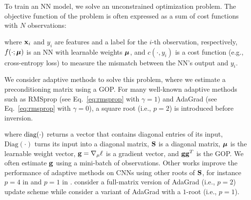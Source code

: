 \vspace{-0.15cm}
To train an NN model,
we solve an unconstrained optimization problem. The objective function of the problem is often expressed as a sum of cost functions with $N$ observations:

\vspace{-0.35cm}

where $\mbox{$\mbox{$\mathbf{x}$}$}_i$ and $y_i$ are features and a label for the $i$-th observation, respectively,
$f(\cdot;\mbox{$\mbox{$\boldsymbol{\mu}$}$})$ is an NN with learnable weights $\mbox{$\mbox{$\boldsymbol{\mu}$}$}$,  and $c(\cdot, y_i)$ is a cost function (e.g., cross-entropy loss) to measure the mismatch between the NN's output and $y_i$.


We consider adaptive methods to solve this problem, where we estimate a preconditioning matrix using a GOP. For many well-known adaptive methods such as RMSprop \citep{tieleman2012rmsprop} (see Eq.~\eqref{eq:rmsprop} with  $\gamma=1$) and AdaGrad \citep{duchi2011adaptive} (see  Eq.~\eqref{eq:rmsprop} with  $\gamma=0$), a square root (i.e., $p=2$) is introduced before inversion.
%

\vspace{-0.4cm}

\vspace{-0.05cm}
where 
$\mbox{$\mbox{diag}$}(\cdot)$ returns a vector that contains diagonal entries
of its input,  $\mathrm{Diag}(\cdot)$ turns its input into a diagonal matrix,
$\mbox{$\mbox{$\mathbf{S}$}$}$ is a diagonal matrix, $\mbox{$\mbox{$\boldsymbol{\mu}$}$}$ is the learnable weight vector,  $\mbox{$\mbox{$\mathbf{g}$}$}=\nabla_\mu \ell$ is a gradient vector, and $\mbox{$\mbox{$\mathbf{g}$}$}\mbox{$\mbox{$\mathbf{g}$}$}^T$ is the GOP. We often estimate $\mbox{$\mbox{$\mathbf{g}$}$}$ using a mini-batch of observations.
Other works improve the performance of adaptive methods on CNNs using other roots of $\mbox{$\mbox{$\mathbf{S}$}$}$, for instance $p=4$ in \citet{chen2021closing} and $p=1$ in \citet{lincan2024}.
\citet{duchi2011adaptive} consider a full-matrix version of AdaGrad (i.e., $p=2$) update scheme while \citet{lincan2024} consider a variant of  AdaGrad with a $1$-root (i.e., $p=1$).

